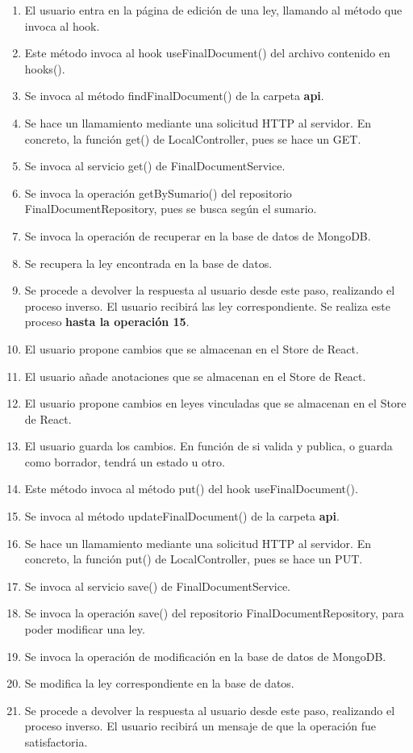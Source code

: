 \begin{enumerate}
    \item El usuario entra en la página de edición de una ley, llamando al método que invoca al hook.
    \item Este método invoca al hook useFinalDocument() del archivo contenido en hooks().
    \item Se invoca al método findFinalDocument() de la carpeta {\bf api}.
    \item Se hace un llamamiento mediante una solicitud HTTP al servidor. En concreto, la función get() de LocalController, pues se hace un GET.
    \item Se invoca al servicio get() de FinalDocumentService.
    \item Se invoca la operación getBySumario() del repositorio FinalDocumentRepository, pues se busca según el sumario.
    \item Se invoca la operación de recuperar en la base de datos de MongoDB.
    \item Se recupera la ley encontrada en la base de datos.
    \item Se procede a devolver la respuesta al usuario desde este paso, realizando el proceso inverso. El usuario recibirá las ley correspondiente. Se realiza este proceso {\bf hasta la operación 15}.
    \item El usuario propone cambios que se almacenan en el Store de React.
    \item El usuario añade anotaciones que se almacenan en el Store de React.
    \item El usuario propone cambios en leyes vinculadas que se almacenan en el Store de React.
    \item El usuario guarda los cambios. En función de si valida y publica, o guarda como borrador, tendrá un estado u otro.
    \item Este método invoca al método put() del hook useFinalDocument().
    \item Se invoca al método updateFinalDocument() de la carpeta  {\bf api}.
    \item Se hace un llamamiento mediante una solicitud HTTP al servidor. En concreto, la función put() de LocalController, pues se hace un PUT.
    \item Se invoca al servicio save() de FinalDocumentService.
    \item Se invoca la operación save() del repositorio FinalDocumentRepository, para poder modificar una ley.
    \item Se invoca la operación de modificación en la base de datos de MongoDB.
    \item Se modifica la ley correspondiente en la base de datos.
    \item Se procede a devolver la respuesta al usuario desde este paso, realizando el proceso inverso. El usuario recibirá un mensaje de que la operación fue satisfactoria.
\end{enumerate}